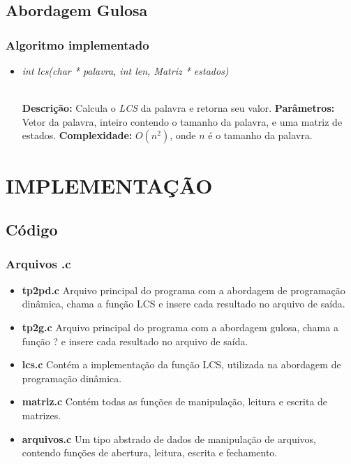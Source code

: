 \documentclass[12pt]{article}
\begin{document}
\subsection{Abordagem Gulosa}
\label{gulosa}


\subsubsection{Algoritmo implementado}

\begin{itemize}
 \item \begin{large}\textit{int lcs(char * palavra, int len, Matriz * estados)}\end{large}\\
 \subitem \textbf{Descrição:} Calcula o \textit{LCS} da palavra e retorna seu valor.
 \subitem \textbf{Parâmetros:} Vetor da palavra, inteiro contendo o tamanho da palavra, e uma matriz de estados.
 \subitem \textbf{Complexidade:} $O(n^2)$, onde $n$ é o tamanho da palavra.
\end{itemize}

\vspace{0.2 true cm}


\section{IMPLEMENTAÇÃO}
\label{implementacao}

\subsection{Código}

\subsubsection{Arquivos .c}

\begin{itemize}
\item \textbf{tp2pd.c} Arquivo principal do programa com a abordagem de programação dinâmica, chama a função LCS e insere cada resultado no arquivo de saída.
\item \textbf{tp2g.c} Arquivo principal do programa com a abordagem gulosa, chama a função ? e insere cada resultado no arquivo de saída.
\item \textbf{lcs.c} Contém a implementação da função LCS, utilizada na abordagem de programação dinâmica.
\item \textbf{matriz.c} Contém todas as funções de manipulação, leitura e escrita de matrizes.
\item \textbf{arquivos.c} Um tipo abstrado de dados de manipulação de arquivos, contendo funções de abertura, leitura, escrita e fechamento.
\end{itemize}
\end{document}
